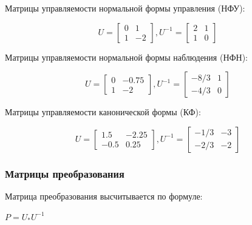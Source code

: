\documentclass[14pt,a4paper,report]{report}
\begin{document}
Матрицы управляемости нормальной формы управления (НФУ):

\begin{equation*}
\text{$U=\begin{bmatrix} 0 & 1 \\ 1 & -2 \end{bmatrix}$}
\text{$, U^{-1}=\begin{bmatrix} 2 & 1 \\ 1 & 0 \end{bmatrix}$}
\end{equation*}

Матрицы управляемости нормальной формы наблюдения (НФН):

\begin{equation*}
\text{$U=\begin{bmatrix} 0 & -0.75 \\ 1 & -2 \end{bmatrix}$}
\text{$, U^{-1}=\begin{bmatrix} -8/3 & 1\\ -4/3 & 0 \end{bmatrix}$}
\end{equation*}

Матрицы управляемости канонической формы (КФ):

\begin{equation*}
\text{$U=\begin{bmatrix} 1.5 & -2.25 \\ -0.5 & 0.25 \end{bmatrix}$}
\text{$, U^{-1}=\begin{bmatrix} -1/3 & -3 \\ -2/3 & -2 \end{bmatrix}$}
\end{equation*}

\subsubsection{Матрицы преобразования}

Матрица преобразования высчитывается по формуле:

\begin{center}
$P=U_{*}U^{-1}$
\end{center}
\end{document}
